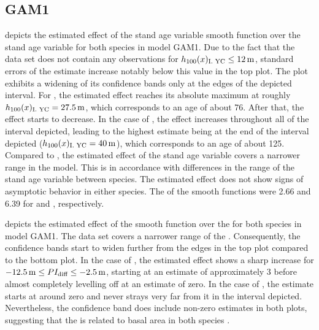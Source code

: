 \subsection{GAM1}

 depicts the estimated effect of the stand age variable smooth function over the stand age variable for both species in model GAM1.
Due to the fact that the \Beech{} data set does not contain any observations for \(h_{100}(x)_{\text{I. YC}}{} \leq \SI{12}{\meter}\), standard errors of the estimate increase notably below this value in the top plot.  The \Spruce{} plot exhibits a widening of its confidence bands only at the edges of the depicted interval.
For \Beech{}, the estimated effect reaches its absolute maximum at roughly \(h_{100}(x)_{\text{I. YC}}{} = \SI{27.5}{\meter}\), which corresponds to an age of about \SI{76}{\year}.  After that, the effect starts to decrease.  In the case of \Spruce{}, the effect increases throughout all of the interval depicted, leading to the highest estimate being at the end of the interval depicted (\(h_{100}(x)_{\text{I. YC}}{} = \SI{40}{\meter}\)), which corresponds to an age of about \SI{125}{\year}.  Compared to \Spruce{}, the estimated effect of the stand age variable covers a narrower range in the \Beech{} model.  This is in accordance with differences in the range of the stand age variable between species.  The estimated effect does not show signs of asymptotic behavior in either species.  The \edf{} of the smooth functions were \num{2.66} and \num{6.39} for \Beech{} and \Spruce{}, respectively.

 depicts the estimated effect of the \ProductivityIndexVariableText{} smooth function over the \ProductivityIndexVariableText{} for both species in model GAM1.
The \Beech{} data set covers a narrower range of the \ProductivityIndexVariableText{}.  Consequently, the confidence bands start to widen further from the edges in the top plot compared to the bottom plot.  In the case of \Beech{}, the estimated effect shows a sharp increase for \(\SI{-12.5}{\meter} \leq PI_{\text{diff}}{} \leq \SI{-2.5}{\meter}\), starting at an estimate of approximately \num{3} before almost completely levelling off at an estimate of zero.  In the case of \Spruce{}, the estimate starts at around zero and never strays very far from it in the interval depicted.  Nevertheless, the confidence band does include non-zero estimates in both plots, suggesting that the \ProductivityIndexVariableText{} is related to basal area in both species \parencite{Wood2001}.




